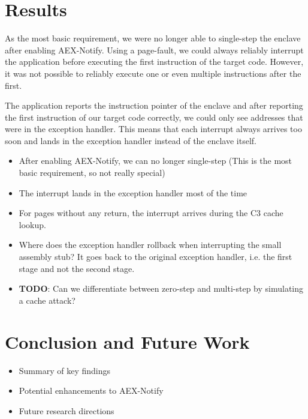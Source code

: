 \documentclass{llncs}
\begin{document}
\section{Results}

As the most basic requirement,
we were no longer able to single-step the enclave after enabling AEX-Notify.
Using a page-fault, we could always reliably interrupt the application
before executing the first instruction of the target code.
However, it was not possible to reliably execute one or even multiple instructions after the first.

The application reports the instruction pointer of the enclave
and after reporting the first instruction of our target code correctly,
we could only see addresses that were in the exception handler.
This means that each interrupt always arrives too soon and
lands in the exception handler instead of the enclave itself.

\begin{itemize}
  \item After enabling AEX-Notify, we can no longer single-step (This is the most basic requirement, so not really special)
  \item The interrupt lands in the exception handler most of the time
  \item For pages without any return, the interrupt arrives during the C3 cache lookup.
  \item Where does the exception handler rollback when interrupting the small assembly stub?
    It goes back to the original exception handler, i.e. the first stage and not the second stage.
  \item \textbf{TODO}: Can we differentiate between zero-step and multi-step by simulating a cache attack?
\end{itemize}

\section{Conclusion and Future Work}
\begin{itemize}
    \item Summary of key findings
    \item Potential enhancements to AEX-Notify
    \item Future research directions
\end{itemize}


%

\end{document}
